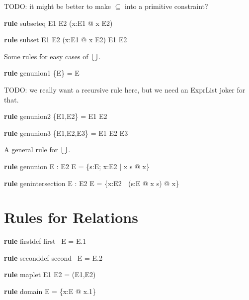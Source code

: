 \documentclass{article}
\newenvironment{zedrule}[1]{\par\textbf{rule }#1\vspace{-1ex}\infrule}{\endinfrule}
\newcommand{\derives}{\derive{}}
\newcommand{\proviso}{\raisebox{0.5ex}{${}_{\blacktriangleright}\ $}}%
\begin{document}
TODO: it might be better to make $\subseteq$ into a primitive constraint?
\begin{zedrule}{subseteq}
   E1 \subseteq E2 \iff (\forall x:E1 @ x \in E2)
\end{zedrule}

\begin{zedrule}{subset}
   E1 \subset E2 \iff (\forall x:E1 @ x \in E2) \land E1 \neq E2
\end{zedrule}

Some rules for easy cases of $\bigcup$.
\begin{zedrule}{genunion1}
   \bigcup \{E\} = E
\end{zedrule}

TODO: we really want a recursive rule here,
but we need an ExprList joker for that.
\begin{zedrule}{genunion2}
   \bigcup \{E1,E2\} = E1 \cup E2
\end{zedrule}
\begin{zedrule}{genunion3}
   \bigcup \{E1,E2,E3\} = E1 \cup E2 \cup E3
\end{zedrule}

A general rule for $\bigcup$.
\begin{zedrule}{genunion}
   \proviso E : \power \power E2
\derives
   \bigcup E = \{s:E; x:E2 | x \in s @ x\}
\end{zedrule}

\begin{zedrule}{genintersection}
   \proviso E : \power \power E2
\derives
   \bigcap E = \{x:E2 | (\forall s:E @ x \in s) @ x\}
\end{zedrule}


\section{Rules for Relations}

\begin{zedrule}{firstdef}
   first~ E = E.1
\end{zedrule}

\begin{zedrule}{seconddef}
   second~ E = E.2
\end{zedrule}

\begin{zedrule}{maplet}
   E1 \mapsto E2 = (E1,E2)
\end{zedrule}

\begin{zedrule}{domain}
   \dom E = \{x:E @ x.1\}
\end{zedrule}
\end{document}
